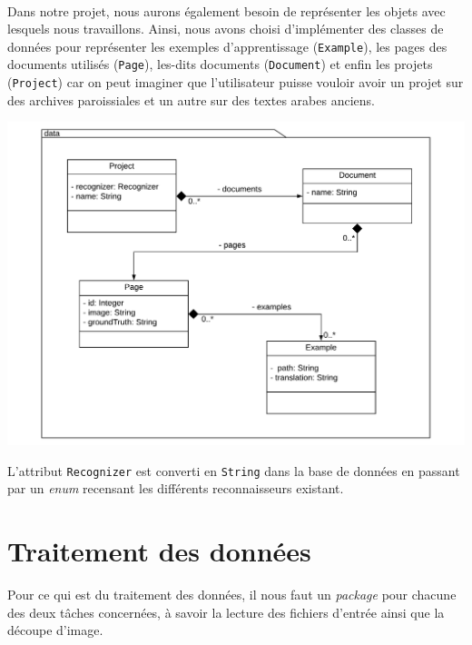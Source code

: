 \paragraph{}
Dans notre projet, nous aurons également besoin de représenter les objets avec lesquels nous travaillons. Ainsi, nous avons choisi d'implémenter des classes de données pour représenter les exemples d'apprentissage (\texttt{Example}), les pages des documents utilisés (\texttt{Page}), les-dits documents (\texttt{Document}) et enfin les projets (\texttt{Project}) car on peut imaginer que l'utilisateur puisse vouloir avoir un projet sur des archives paroissiales et un autre sur des textes arabes anciens.

\begin{mdframed}[frametitle={Structure du package de données}, innerbottommargin=10]
\begin{center}
\includegraphics[scale=0.5]{assets/UML_data.pdf}
\end{center}
\end{mdframed}

L'attribut \texttt{Recognizer} est converti en \texttt{String} dans la base de données en passant par un \textit{enum} recensant les différents reconnaisseurs existant.


\section{Traitement des données}

Pour ce qui est du traitement des données, il nous faut un \textit{package} pour chacune des deux tâches concernées, à savoir la lecture des fichiers d'entrée ainsi que la découpe d'image.

